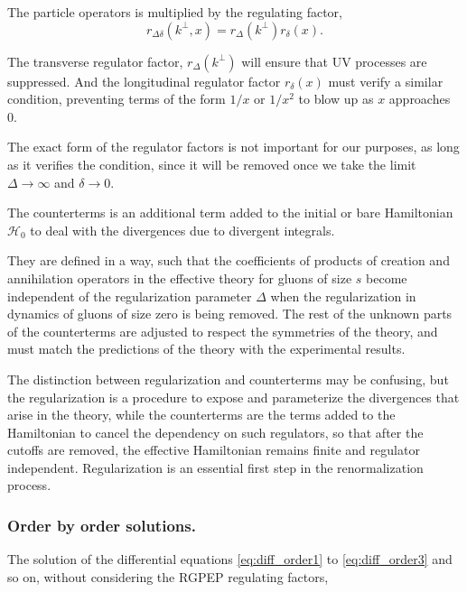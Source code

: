 \documentclass[11pt,a4paper,twoside,pdf]{article}
\numberwithin{equation}{section}
\begin{document}
The particle operators is multiplied by the regulating factor, 
\begin{equation}
    r_{\Delta \delta} (k^\perp, x) = r_\Delta (k^\perp) r_\delta(x).
\end{equation}

The transverse regulator factor, $r_\Delta (k^\perp)$ will ensure that UV processes are suppressed.
And the longitudinal regulator factor $r_\delta(x)$ must verify a similar condition, preventing terms
of the form $1/x$ or $1/x^2$ to blow up as $x$ approaches 0. 

The exact form of the regulator factors is not important for our purposes, as long as it 
verifies the condition, since it will be removed once we take the
limit $\Delta \to \infty$ and $\delta \to 0$.

The counterterms is an additional term added to the initial or bare Hamiltonian 
$\mathcal{H}_0$ to deal with the divergences due to divergent integrals. 

They are defined in a way, such that the coefficients of products 
of creation and annihilation operators in the effective theory for gluons of size $s$
become independent of the regularization parameter $\Delta$ when the regularization
in dynamics of gluons of size zero is being removed. The rest of the unknown parts 
of the counterterms are adjusted to respect the symmetries of the theory, and must 
match the predictions of the theory with the experimental results.

The distinction between regularization and counterterms may be confusing, but the
regularization is a procedure to expose and parameterize the divergences that arise
in the theory, while the counterterms are the terms added to the Hamiltonian to 
cancel the dependency on such regulators, so that after the cutoffs are removed, the 
effective Hamiltonian remains finite and regulator independent. Regularization is
an essential first step in the renormalization process.

\subsubsection{Order by order solutions.} \label{sec:orderbyorder_solutions}

The solution of the differential equations \eqref{eq:diff_order1} to \eqref{eq:diff_order3} 
and so on, without considering the RGPEP regulating factors,
\end{document}
